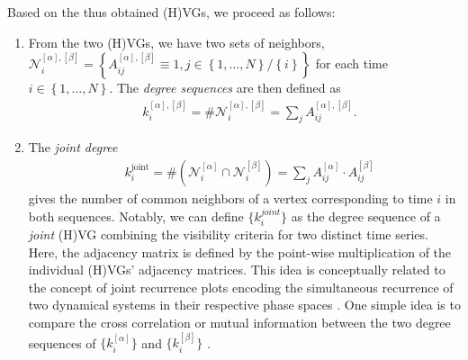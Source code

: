 Based on the thus obtained (H)VGs, we proceed as follows:
\begin{enumerate}
\item From the two (H)VGs, we have two sets of neighbors, $\mathcal{N}_i^{[\alpha],[\beta]} = \left\{ A_{ij}^{{[\alpha]}, {[\beta]}} \equiv 1, j \in \left\{1,\ldots, N \right\}/\left\{i\right\} \right\}$ for each time $i \in \left\{1,\ldots, N \right\}$. The \textit{degree sequences} are then defined as
\begin{align}
&k_i^{{[\alpha]}, {[\beta]}} = \# \mathcal{N}_i^{{[\alpha]}, {[\beta]}} = \sum_{j} A_{ij}^{{[\alpha]}, {[\beta]}}.
\end{align}

\item The \textit{joint degree}
\begin{align} \label{eq:jointK}
&k_i^\textrm{joint} = \# \left( \mathcal{N}_i^{{[\alpha]}} \cap \mathcal{N}_i^{{[\beta]}} \right) = \sum_{j} A_{ij}^{{[\alpha]}}\cdot A_{ij}^{{[\beta]}}
\end{align}
gives the number of common neighbors of a vertex corresponding to time $i$ in both sequences. Notably, we can define $\{k_i^{joint}\}$ as the degree sequence of a \textit{joint} (H)VG combining the visibility criteria for two distinct time series. Here, the adjacency matrix is defined by the point-wise multiplication of the individual (H)VGs' adjacency matrices. This idea is conceptually related to the concept of joint recurrence plots encoding the simultaneous recurrence of two dynamical systems in their respective phase spaces \cite{romano2004}. One simple idea is to compare the cross correlation or mutual information between the two degree sequences of $\{k_i^{[\alpha]}\}$ and $\{k_i^{[\beta]}\}$ \cite{Lacasa2015b,Ahmadi2018}. 


\end{enumerate}
